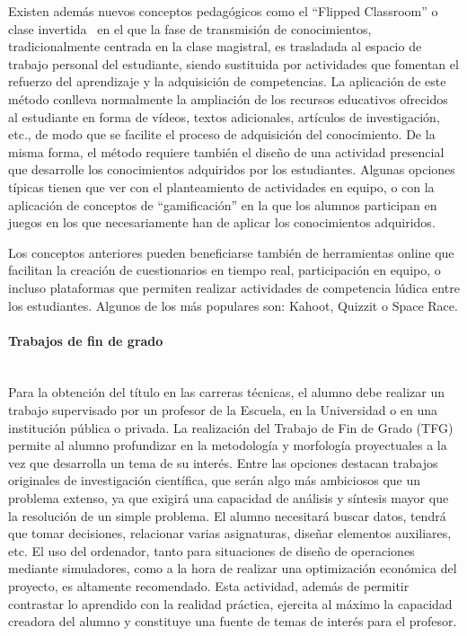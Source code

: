 Existen además nuevos conceptos pedagógicos como el ``Flipped Classroom'' o clase invertida~\cite{flipped} en el que la fase de transmisión de conocimientos, tradicionalmente centrada en la clase magistral, es trasladada al espacio de trabajo personal del estudiante, siendo sustituida por actividades que fomentan el refuerzo del aprendizaje y la adquisición de competencias. La aplicación de este método conlleva normalmente la ampliación de los recursos educativos ofrecidos al estudiante en forma de vídeos, textos adicionales, artículos de investigación, etc., de modo que se facilite el proceso de adquisición del conocimiento. De la misma forma, el método requiere también el diseño de una actividad presencial que desarrolle los conocimientos adquiridos por los estudiantes. Algunas opciones típicas tienen que ver con el planteamiento de actividades en equipo, o con la aplicación de conceptos de ``gamificación'' en la que los alumnos participan en juegos en los que necesariamente han de aplicar los conocimientos adquiridos. 

Los conceptos anteriores pueden beneficiarse también de herramientas online que facilitan la creación de cuestionarios en tiempo real, participación en equipo, o incluso plataformas que permiten realizar actividades de competencia lúdica entre los estudiantes. Algunos de los más populares son: Kahoot, Quizzit o Space Race. 



\paragraph{Trabajos de fin de grado\\\\} \label{sec:proyecto}

Para la obtención del título en las carreras técnicas, el alumno debe realizar un trabajo supervisado por un profesor de la Escuela, en la Universidad o en una institución pública o privada. La realización del Trabajo de Fin de Grado (TFG) permite al alumno profundizar en la metodología y morfología proyectuales a la vez que desarrolla un tema de su interés. Entre las opciones destacan trabajos originales de investigación científica, que serán algo más ambiciosos que un problema extenso, ya que exigirá una capacidad de análisis y síntesis mayor que la resolución de un simple problema. El alumno necesitará buscar datos, tendrá que tomar decisiones, relacionar varias asignaturas, diseñar elementos auxiliares, etc. El uso del ordenador, tanto para situaciones de diseño de operaciones mediante simuladores, como a la hora de realizar una optimización económica del proyecto, es altamente recomendado. Esta actividad, además de permitir contrastar lo aprendido con la realidad práctica, ejercita al máximo la capacidad creadora del alumno y constituye una fuente de temas de interés para el profesor.


